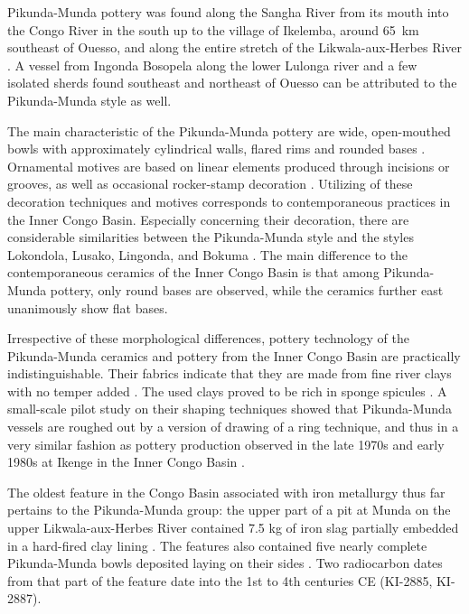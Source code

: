 \documentclass[smallextended,natbib]{svjour3}       %
\begin{document}
Pikunda-Munda pottery was found along the Sangha River from its mouth into the Congo River in the south up to the village of Ikelemba, around 65~km southeast of Ouesso, and along the entire stretch of the Likwala-aux-Herbes River \citep[Fig.~\ref{fig:timeslices};][119 Fig.~49]{Seidensticker.2021e}. A vessel from Ingonda Bosopela along the lower Lulonga river \citep[119 Ftn. 4, 531 Pl. 97.5]{Wotzka.1995} and a few isolated sherds found southeast and northeast of Ouesso \citep[114 Fig.~42]{Gillet.2013} can be attributed to the Pikunda-Munda style as well.

The main characteristic of the Pikunda-Munda pottery are wide, open-mouthed bowls with approximately cylindrical walls, flared rims and rounded bases \citep[Fig.~\ref{fig:sangha}:1--3;][311--314]{Eggert.1993}. Ornamental motives are based on linear elements produced through incisions or grooves, as well as occasional rocker-stamp decoration \citep[362 Appendix 4.12]{Seidensticker.2021e}. Utilizing of these decoration techniques and motives corresponds to contemporaneous practices in the Inner Congo Basin. Especially concerning their decoration, there are considerable similarities between the Pikunda-Munda style and the styles Lokondola, Lusako, Lingonda, and Bokuma \citep[107]{Wotzka.1995}. The main difference to the contemporaneous ceramics of the Inner Congo Basin is that among Pikunda-Munda pottery, only round bases are observed, while the ceramics further east unanimously show flat bases.

Irrespective of these morphological differences, pottery technology of the Pikunda-Munda ceramics and pottery from the Inner Congo Basin are practically indistinguishable. Their fabrics indicate that they are made from fine river clays with no temper added \citep[66--67 Fig.~21]{Seidensticker.2021e}. The used clays proved to be rich in sponge spicules \citep{Seidensticker.2020}. A small-scale pilot study on their shaping techniques showed that Pikunda-Munda vessels are roughed out by a version of drawing of a ring technique, and thus in a very similar fashion as pottery production observed in the late 1970s and early 1980s at Ikenge in the Inner Congo Basin \citep{Eggert.1980c}.

The oldest feature in the Congo Basin associated with iron metallurgy thus far pertains to the Pikunda-Munda group: the upper part of a pit at Munda on the upper Likwala-aux-Herbes River contained 7.5 kg of iron slag partially embedded in a hard-fired clay lining \citep[321--330]{Seidensticker.2021e}. The features also contained five nearly complete Pikunda-Munda bowls deposited laying on their sides \citep[323 Fig.~157.A--E; Pl.~91.1--5]{Seidensticker.2021e}. Two radiocarbon dates from that part of the feature date into the 1st to 4th centuries CE (KI-2885, KI-2887).
\end{document}
